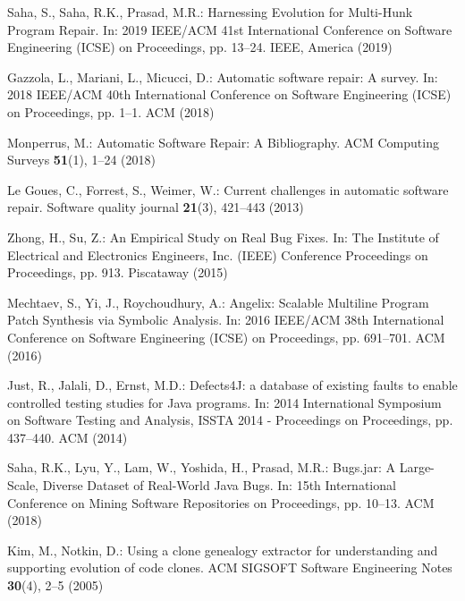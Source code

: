 \documentclass[runningheads]{llncs}
\begin{document}
%
%
% 

% 
%
\newpage
\begin{thebibliography}{8}
Saha, S., Saha, R.K., Prasad, M.R.: Harnessing Evolution for Multi-Hunk Program Repair. In: 2019 IEEE/ACM 41st International Conference on Software Engineering (ICSE)
on Proceedings, pp. 13--24. IEEE, America (2019)

Gazzola, L., Mariani, L., Micucci, D.: Automatic software repair: A survey. In: 2018 IEEE/ACM 40th International Conference on Software Engineering (ICSE)
on Proceedings, pp. 1--1. ACM (2018)

Monperrus, M.: Automatic Software Repair: A Bibliography. ACM Computing Surveys \textbf{51}(1), 1--24 (2018)

Le Goues, C., Forrest, S., Weimer, W.: Current challenges in automatic software repair. Software quality journal \textbf{21}(3), 421--443 (2013)

Zhong, H., Su, Z.: An Empirical Study on Real Bug Fixes. In: The Institute of Electrical and Electronics Engineers, Inc. (IEEE) Conference Proceedings
on Proceedings, pp. 913. Piscataway (2015)

Mechtaev, S., Yi, J., Roychoudhury, A.: Angelix: Scalable Multiline Program Patch Synthesis via Symbolic Analysis. In: 2016 IEEE/ACM 38th International Conference on Software Engineering (ICSE)
on Proceedings, pp. 691--701. ACM (2016)

Just, R., Jalali, D., Ernst, M.D.: Defects4J: a database of existing faults to enable controlled testing studies for Java programs. In: 2014 International Symposium on Software Testing and Analysis, ISSTA 2014 - Proceedings
on Proceedings, pp. 437--440. ACM (2014)

Saha, R.K., Lyu, Y., Lam, W., Yoshida, H., Prasad, M.R.: Bugs.jar: A Large-Scale, Diverse Dataset of Real-World Java Bugs. In: 15th International Conference on Mining Software Repositories
on Proceedings, pp. 10--13. ACM (2018)

Kim, M., Notkin, D.: Using a clone genealogy extractor for understanding and supporting evolution of code clones. ACM SIGSOFT Software Engineering Notes \textbf{30}(4), 2--5 (2005)


\end{thebibliography}
\end{document}
